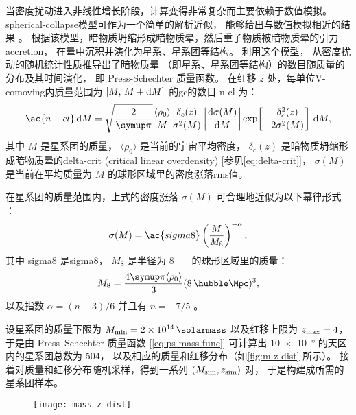 当密度扰动进入非线性增长阶段，计算变得非常复杂而主要依赖于数值模拟。
\ac{spherical-collapse}模型可作为一个简单的解析近似，
能够给出与数值模拟相近的结果 \cite{gunn1972}。
根据该模型，暗物质坍缩形成暗物质晕，然后重子物质被暗物质晕的引力\ac{accretion}，
在晕中沉积并演化为星系、星系团等结构。
利用这个模型， 从密度扰动的随机统计性质推导出了暗物质晕
（即星系、星系团等结构）的数目随质量的分布及其时间演化，
即 Press-Schechter 质量函数。
在红移 $z$ 处，每单位\ac{V-comoving}内质量范围为 $[M,\, M+\mathrm{d}M]$
的\ac{gc}的数目 \ac{n-cl} 为：
\begin{equation}
  \label{eq:ps-mass-func}
  \ac{n-cl} \,\D{M} =
    \sqrt{\frac{2}{\Cpi}} \frac{\langle \rho_0 \rangle}{M}
    \frac{\delta_c(z)}{\sigma^2(M)} \left| \diff{\sigma(M)}{M} \right|
    \exp\!\left[ -\frac{\delta_c^2(z)}{2\sigma^2(M)} \right] \,\D{M} ,
\end{equation}
其中
$M$ 是星系团的质量，
$\langle \rho_0 \rangle$ 是当前的宇宙平均密度，
$\delta_c(z)$ 是暗物质坍缩形成暗物质晕的\acl{delta-crit}
(critical linear overdensity) [参见\autoref{eq:delta-crit}]，
$\sigma(M)$ 是当前在平均质量为 $M$ 的球形区域里的密度涨落\ac{rms}值。

在星系团的质量范围内，上式的密度涨落 $\sigma(M)$ 可合理地近似为以下幂律形式
\cite{sarazin2002,randall2002}：
\begin{equation}
  \label{eq:sigma-mass}
  \sigma(M) = \ac{sigma8} \left( \frac{M}{M_8} \right)^{-\alpha} ,
\end{equation}
其中
\ac{sigma8} 是\acl{sigma8}，
$M_8$ 是半径为 \SI{8}{\per\hubble\Mpc} 的球形区域里的质量：
\begin{equation}
  M_8 = \frac{4\Cpi \langle \rho_0 \rangle}{3}
    (\SI{8}{\per\hubble\Mpc})^3 ,
\end{equation}
以及指数 $\alpha = (n+3)/6$ 并且有 $n = -7/5$ \cite{bahcall1998}。

设星系团的质量下限为 $M_{\R{min}} = \SI{2e14}{\solarmass}$
以及红移上限为 $z_{\mathrm{max}} = 4$，
于是由 Press--Schechter 质量函数 [\autoref{eq:ps-mass-func}]
可计算出 \SI{10 x 10}{\degree} 的天区内的星系团总数为 504，
以及相应的质量和红移分布（如\autoref{fig:m-z-dist} 所示）。
接着对质量和红移分布随机采样，得到一系列 $(M_{\mathrm{sim}}, z_{\mathrm{sim}})$ 对，
于是构建成所需的星系团样本。

\begin{figure}[htp]
  \centering
  \texttt{[image: mass-z-dist]}
  \label{fig:m-z-dist}
\end{figure}

